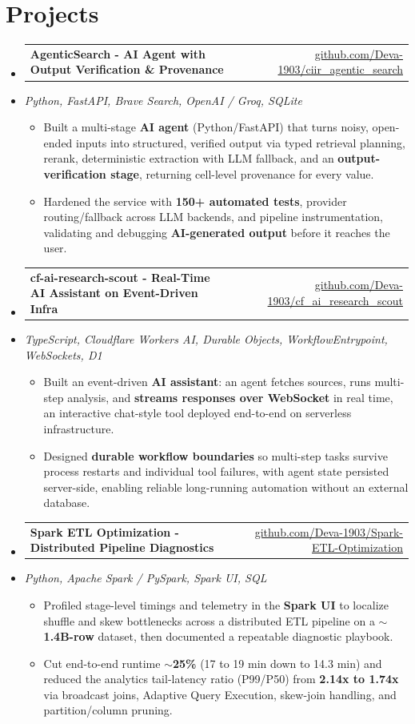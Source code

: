 \documentclass[letterpaper,10pt]{article}
\makeatletter
\newcommand{\resumeItem}[1]{
  \item\small{#1\vspace{-1pt}}
}
\newcommand{\resumeProjectHeading}[2]{
    \item
    \begin{tabular*}{0.985\textwidth}[t]{l@{\extracolsep{\fill}}r}
      \small\textbf{#1} & \small #2 \\
    \end{tabular*}\vspace{-5pt}
}
\newcommand{\resumeProjectSubheading}[1]{
  \vspace{-2pt}\item[] {\small\textcolor{ResumeSlate}{\emph{#1}}}\vspace{-3pt}
}
\newcommand{\resumeSubHeadingListStart}{\begin{itemize}[leftmargin=0.0in, label={}, itemsep=2pt, topsep=2pt]}
\newcommand{\resumeSubHeadingListEnd}{\end{itemize}}
\newcommand{\resumeItemListStart}{\begin{itemize}[leftmargin=0.18in, itemsep=2pt, topsep=1pt]}
\newcommand{\resumeItemListEnd}{\end{itemize}\vspace{-4pt}}
\makeatother
\begin{document}
\section{Projects}
\resumeSubHeadingListStart
  \resumeProjectHeading
    {AgenticSearch - AI Agent with Output Verification \& Provenance}
    {\href{https://github.com/Deva-1903/ciir_agentic_search}{github.com/Deva-1903/ciir\_agentic\_search}}
  \resumeProjectSubheading{Python, FastAPI, Brave Search, OpenAI / Groq, SQLite}
    \resumeItemListStart
      \resumeItem{Built a multi-stage \textbf{AI agent} (Python/FastAPI) that turns noisy, open-ended inputs into structured, verified output via typed retrieval planning, rerank, deterministic extraction with LLM fallback, and an \textbf{output-verification stage}, returning cell-level provenance for every value.}
      \resumeItem{Hardened the service with \textbf{150+ automated tests}, provider routing/fallback across LLM backends, and pipeline instrumentation, validating and debugging \textbf{AI-generated output} before it reaches the user.}
    \resumeItemListEnd
  \resumeProjectHeading
    {cf-ai-research-scout - Real-Time AI Assistant on Event-Driven Infra}
    {\href{https://github.com/Deva-1903/cf_ai_research_scout}{github.com/Deva-1903/cf\_ai\_research\_scout}}
  \resumeProjectSubheading{TypeScript, Cloudflare Workers AI, Durable Objects, WorkflowEntrypoint, WebSockets, D1}
    \resumeItemListStart
      \resumeItem{Built an event-driven \textbf{AI assistant}: an agent fetches sources, runs multi-step analysis, and \textbf{streams responses over WebSocket} in real time, an interactive chat-style tool deployed end-to-end on serverless infrastructure.}
      \resumeItem{Designed \textbf{durable workflow boundaries} so multi-step tasks survive process restarts and individual tool failures, with agent state persisted server-side, enabling reliable long-running automation without an external database.}
    \resumeItemListEnd
  \resumeProjectHeading
    {Spark ETL Optimization - Distributed Pipeline Diagnostics}
    {\href{https://github.com/Deva-1903/Spark-ETL-Optimization}{github.com/Deva-1903/Spark-ETL-Optimization}}
  \resumeProjectSubheading{Python, Apache Spark / PySpark, Spark UI, SQL}
    \resumeItemListStart
      \resumeItem{Profiled stage-level timings and telemetry in the \textbf{Spark UI} to localize shuffle and skew bottlenecks across a distributed ETL pipeline on a \textbf{$\sim$1.4B-row} dataset, then documented a repeatable diagnostic playbook.}
      \resumeItem{Cut end-to-end runtime \textbf{$\sim$25\%} (17 to 19 min down to 14.3 min) and reduced the analytics tail-latency ratio (P99/P50) from \textbf{2.14x to 1.74x} via broadcast joins, Adaptive Query Execution, skew-join handling, and partition/column pruning.}
    \resumeItemListEnd
\resumeSubHeadingListEnd
\vspace{-4pt}
\end{document}
